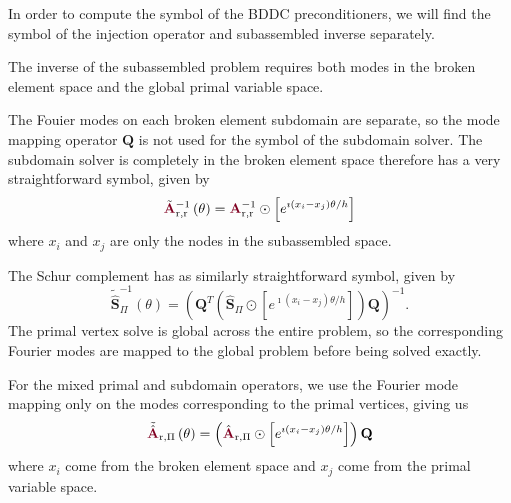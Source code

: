 In order to compute the symbol of the BDDC preconditioners, we will find the symbol of the injection operator and subassembled inverse separately.

The inverse of the subassembled problem requires both modes in the broken element space and the global primal variable space.

The Fouier modes on each broken element subdomain are separate, so the mode mapping operator $\mathbf{Q}$ is not used for the symbol of the subdomain solver.
The subdomain solver is completely in the broken element space therefore has a very straightforward symbol, given by
\begin{equation}
\tilde{\color{burgundy}\mathbf{A}}_{\text{r}, \text{r}}^{-1} \left( \theta \right) = {\color{burgundy}\mathbf{A}}_{\text{r}, \text{r}}^{-1} \odot \left[ e^{\imath \left( x_i - x_j \right) \theta / h} \right]
\end{equation}
where $x_i$ and $x_j$ are only the nodes in the subassembled space.

The Schur complement has as similarly straightforward symbol, given by
\begin{equation}
\tilde{\hat{\mathbf{S}}}_{\Pi}^{-1} \left( \theta \right) = \left( \mathbf{Q}^T \left( \hat{\mathbf{S}}_{\Pi} \odot \left[ e^{\imath \left( x_i - x_j \right) \theta / h} \right] \right) \mathbf{Q} \right)^{-1}.
\end{equation}
The primal vertex solve is global across the entire problem, so the corresponding Fourier modes are mapped to the global problem before being solved exactly.

For the mixed primal and subdomain operators, we use the Fourier mode mapping only on the modes corresponding to the primal vertices, giving us
\begin{equation}
\tilde{\hat{\color{burgundy}\mathbf{A}}}\color{black}_{\text{r}, \Pi} \left( \theta \right) = \left( \hat{\color{burgundy}\mathbf{A}}_{\text{r}, \Pi} \odot \left[ e^{\imath \left( x_i - x_j \right) \theta / h} \right] \right) \mathbf{Q}
\end{equation}
where $x_i$ come from the broken element space and $x_j$ come from the primal variable space.

